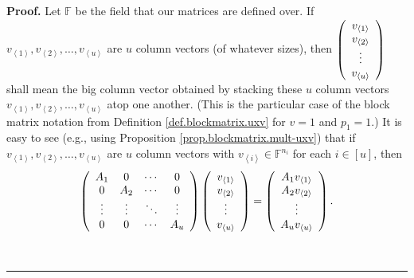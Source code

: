 \documentclass[numbers=enddot,12pt,final,onecolumn,notitlepage]{scrartcl}%
\numberwithin{exer}{subsection}
\theoremstyle{definition}
\newenvironment{proof}[1][Proof]{\noindent\textbf{#1.} }{\ \rule{0.5em}{0.5em}}
\begin{document}
\begin{proof}
Let $\mathbb{F}$ be the field that our matrices are defined over. If
$v_{\left\langle 1\right\rangle },v_{\left\langle 2\right\rangle }%
,\ldots,v_{\left\langle u\right\rangle }$ are $u$ column vectors (of whatever
sizes), then $\left(
\begin{array}
[c]{c}%
v_{\left\langle 1\right\rangle }\\
v_{\left\langle 2\right\rangle }\\
\vdots\\
v_{\left\langle u\right\rangle }%
\end{array}
\right)  $ shall mean the big column vector obtained by stacking these $u$
column vectors $v_{\left\langle 1\right\rangle },v_{\left\langle
2\right\rangle },\ldots,v_{\left\langle u\right\rangle }$ atop one another.
(This is the particular case of the block matrix notation from Definition
\ref{def.blockmatrix.uxv} for $v=1$ and $p_{1}=1$.) It is easy to see (e.g.,
using Proposition \ref{prop.blockmatrix.mult-uxv}) that if $v_{\left\langle
1\right\rangle },v_{\left\langle 2\right\rangle },\ldots,v_{\left\langle
u\right\rangle }$ are $u$ column vectors with $v_{\left\langle i\right\rangle
}\in\mathbb{F}^{n_{i}}$ for each $i\in\left[  u\right]  $, then
\begin{equation}
\left(
\begin{array}
[c]{cccc}%
A_{1} & 0 & \cdots & 0\\
0 & A_{2} & \cdots & 0\\
\vdots & \vdots & \ddots & \vdots\\
0 & 0 & \cdots & A_{u}%
\end{array}
\right)  \left(
\begin{array}
[c]{c}%
v_{\left\langle 1\right\rangle }\\
v_{\left\langle 2\right\rangle }\\
\vdots\\
v_{\left\langle u\right\rangle }%
\end{array}
\right)  =\left(
\begin{array}
[c]{c}%
A_{1}v_{\left\langle 1\right\rangle }\\
A_{2}v_{\left\langle 2\right\rangle }\\
\vdots\\
A_{u}v_{\left\langle u\right\rangle }%
\end{array}
\right)  . \label{pf.prop.blockmatrix.nullity-diag.1}%
\end{equation}



\end{proof}
\end{document}
